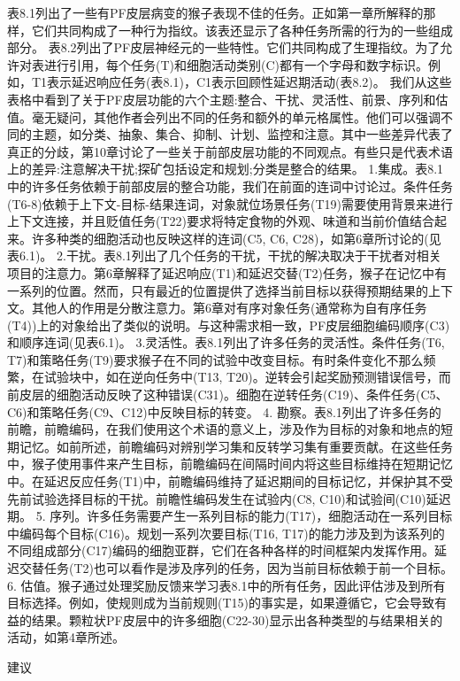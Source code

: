 表8.1列出了一些有PF皮层病变的猴子表现不佳的任务。正如第一章所解释的那样，它们共同构成了一种行为指纹。该表还显示了各种任务所需的行为的一些组成部分。
表8.2列出了PF皮层神经元的一些特性。它们共同构成了生理指纹。为了允许对表进行引用，每个任务(T)和细胞活动类别(C)都有一个字母和数字标识。例如，T1表示延迟响应任务(表8.1)，C1表示回顾性延迟期活动(表8.2)。
我们从这些表格中看到了关于PF皮层功能的六个主题:整合、干扰、灵活性、前景、序列和估值。毫无疑问，其他作者会列出不同的任务和额外的单元格属性。他们可以强调不同的主题，如分类、抽象、集合、抑制、计划、监控和注意。其中一些差异代表了真正的分歧，第10章讨论了一些关于前部皮层功能的不同观点。有些只是代表术语上的差异:注意解决干扰;探矿包括设定和规划;分类是整合的结果。
1.集成。表8.1中的许多任务依赖于前部皮层的整合功能，我们在前面的连词中讨论过。条件任务(T6-8)依赖于上下文-目标-结果连词，对象就位场景任务(T19)需要使用背景来进行上下文连接，并且贬值任务(T22)要求将特定食物的外观、味道和当前价值结合起来。许多种类的细胞活动也反映这样的连词(C5, C6, C28)，如第6章所讨论的(见表6.1)。
2.干扰。表8.1列出了几个任务的干扰，干扰的解决取决于干扰者对相关项目的注意力。第6章解释了延迟响应(T1)和延迟交替(T2)任务，猴子在记忆中有一系列的位置。然而，只有最近的位置提供了选择当前目标以获得预期结果的上下文。其他人的作用是分散注意力。第6章对有序对象任务(通常称为自有序任务(T4))上的对象给出了类似的说明。与这种需求相一致，PF皮层细胞编码顺序(C3)和顺序连词(见表6.1)。
3.灵活性。表8.1列出了许多任务的灵活性。条件任务(T6, T7)和策略任务(T9)要求猴子在不同的试验中改变目标。有时条件变化不那么频繁，在试验块中，如在逆向任务中(T13, T20)。逆转会引起奖励预测错误信号，而前皮层的细胞活动反映了这种错误(C31)。细胞在逆转任务(C19)、条件任务(C5、C6)和策略任务(C9、C12)中反映目标的转变。
4. 勘察。表8.1列出了许多任务的前瞻，前瞻编码，在我们使用这个术语的意义上，涉及作为目标的对象和地点的短期记忆。如前所述，前瞻编码对辨别学习集和反转学习集有重要贡献。在这些任务中，猴子使用事件来产生目标，前瞻编码在间隔时间内将这些目标维持在短期记忆中。在延迟反应任务(T1)中，前瞻编码维持了延迟期间的目标记忆，并保护其不受先前试验选择目标的干扰。前瞻性编码发生在试验内(C8, C10)和试验间(C10)延迟期。
5. 序列。许多任务需要产生一系列目标的能力(T17)，细胞活动在一系列目标中编码每个目标(C16)。规划一系列次要目标(T16, T17)的能力涉及到为该系列的不同组成部分(C17)编码的细胞亚群，它们在各种各样的时间框架内发挥作用。延迟交替任务(T2)也可以看作是涉及序列的任务，因为当前目标依赖于前一个目标。
6. 估值。猴子通过处理奖励反馈来学习表8.1中的所有任务，因此评估涉及到所有目标选择。例如，使规则成为当前规则(T15)的事实是，如果遵循它，它会导致有益的结果。颗粒状PF皮层中的许多细胞(C22-30)显示出各种类型的与结果相关的活动，如第4章所述。

建议







